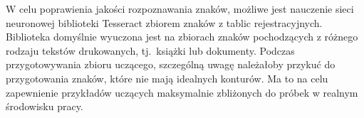 W celu poprawienia jakości rozpoznawania znaków, możliwe jest nauczenie sieci neuronowej biblioteki Tesseract zbiorem znaków z tablic rejestracyjnych.
Biblioteka domyślnie wyuczona jest na zbiorach znaków pochodzących z różnego rodzaju tekstów drukowanych, tj.\ książki lub dokumenty.
Podczas przygotowywania zbioru uczącego, szczególną uwagę należałoby przykuć do przygotowania znaków, które nie mają idealnych konturów.
Ma to na celu zapewnienie przykładów uczących maksymalnie zbliżonych do próbek w realnym środowisku pracy.